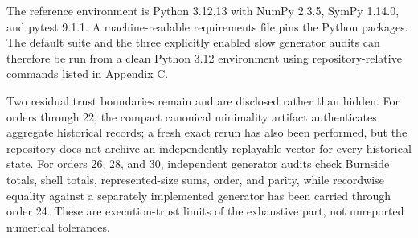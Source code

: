 The reference environment is Python 3.12.13 with NumPy 2.3.5, SymPy 1.14.0,
and pytest 9.1.1. A machine-readable requirements file pins the Python
packages. The default suite and the three explicitly enabled slow generator
audits can therefore be run from a clean Python 3.12 environment using
repository-relative commands listed in Appendix C.

Two residual trust boundaries remain and are disclosed rather than hidden.
For orders through 22, the compact canonical minimality artifact authenticates
aggregate historical records; a fresh exact rerun has also been performed, but
the repository does not archive an independently replayable vector for every
historical state. For orders 26, 28, and 30, independent generator audits check
Burnside totals, shell totals, represented-size sums, order, and parity, while
recordwise equality against a separately implemented generator has been
carried through order 24. These are execution-trust limits of the exhaustive
part, not unreported numerical tolerances.

